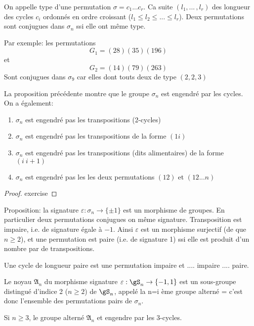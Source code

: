 \begin{proposition}
	On appelle type d'une permutation $\sigma=c_1... c_r$. Ca suite $(l_1,...\,,l_r)$ des longueur des cycles $c_i$ ordonnés en ordre croissant ($l_1\leq l_2\leq ... \leq l_r$).
	Deux permutations sont conjugues dans $\sigma_n$ ssi elle ont même type.
\end{proposition}

Par exemple: les permutations
$$G_1=(28)(35)(196)$$
et
$$G_2=(14)(79)(263)$$
Sont conjugues dans $\sigma_9$ car elles dont touts deux de type $(2,2,3)$


La proposition précédente montre que le groupe $\sigma_n$ est engendré par les cycles. On a également:

\begin{theorem}
	\begin{enumerate}
		\item $\sigma_n$ est engendré pas les transpositions (2-cycles)
		\item $\sigma_n$ est engendré pas les transpositions de la forme $(1 i)$
		\item $\sigma_n$ est engendré pas les transpositions (dits alimentaires) de la forme $(i\ i+1)$
		\item $\sigma_n$ est engendré pas les les deux permutations $(12)$ et $(12...n)$
	\end{enumerate}
	
\end{theorem}
\begin{proof}
	exercise
\end{proof}

Proposition: la signature $\varepsilon : \sigma_n\rightarrow\{\pm 1\}$ est un morphisme de groupes. En particulier deux permutations conjugues on même signature.
Transposition est impaire, i.e. de signature égale à $-1$.
Ainsi $\varepsilon$ est un morphisme surjectif (de que $n\geq 2$), et une permutation est paire (i.e. de signature 1) ssi elle est produit d'un nombre par de transpositions.

Une cycle de longueur paire est une permutation impaire et .... impaire .... paire.

Le noyau $\mathfrak{A}_n$ du morphisme signature $\varepsilon:\gS_n\rightarrow\{-1, 1\}$ est un sous-groupe distingué d'indice 2 ($n\geq2$) de $\gS_n$, appelé la n=i ème groupe alterné = c'est donc l'ensemble des permutations pairs de $\sigma_n$.

\begin{proposition}
	Si $n\geq 3$, le groupe alterné $\mathfrak{A}_n$ et engendre par les 3-cycles.
\end{proposition}

